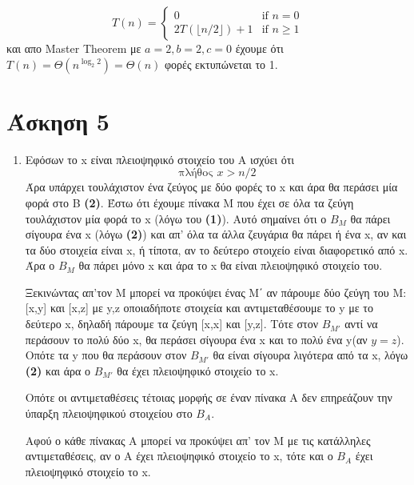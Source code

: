 \documentclass[a4paper,10pt]{article}
\begin{document}
\begin{flushleft}
\begin{enumerate}
        \begin{equation*}
            T(n) = 
            \begin{cases}
            0 & \text{if } n = 0 \\
            2T(\lfloor n/2 \rfloor) + 1 & \text{if } n \geq 1
            \end{cases}
        \end{equation*}
        και απο Master Theorem με $a=2, b=2, c=0$ έχουμε ότι $T(n) = \Theta(n^{\log_2{2}}) = \Theta(n)$ φορές εκτυπώνεται το 1.
    \end{enumerate}

    \newpage
    \section*{Άσκηση 5}
    \begin{enumerate}
        \item Εφόσων το x είναι πλειοψηφικό στοιχείο του Α ισχύει ότι
        \begin{equation}
            \text{πλήθος } x > n/2
        \end{equation}
        Άρα υπάρχει τουλάχιστον ένα ζεύγος με δύο φορές το x και άρα θα περάσει μία φορά στο Β \textbf{(2)}.
        Έστω ότι έχουμε πίνακα Μ που έχει σε όλα τα ζεύγη τουλάχιστον μία φορά το x (λόγω του \textbf{(1)}). Αυτό σημαίνει ότι ο $B_M$ θα πάρει σίγουρα ένα x (λόγω \textbf{(2)}) και απ' όλα τα άλλα ζευγάρια θα πάρει ή ένα x, αν και τα δύο στοιχεία είναι x, ή τίποτα, αν το δεύτερο στοιχείο είναι διαφορετικό από x. Άρα ο $B_M$ θα πάρει μόνο x και άρα το x θα είναι πλειοψηφικό στοιχείο του.

        Ξεκινώντας απ'τον Μ μπορεί να προκύψει ένας Μ΄ αν πάρουμε δύο ζεύγη του Μ: [x,y] και [x,z] με y,z οποιαδήποτε στοιχεία και αντιμεταθέσουμε το y με το δεύτερο x, δηλαδή πάρουμε τα ζεύγη [x,x] και [y,z]. Τότε στον $B_{M'}$ αντί να περάσουν το πολύ δύο x, θα περάσει σίγουρα ένα x και το πολύ ένα y(αν $y=z$). Οπότε τα y που θα περάσουν στον $B_{M'}$ θα είναι σίγουρα λιγότερα από τα x, λόγω \textbf{(2)} και άρα ο $B_{M'}$ θα έχει πλειοψηφικό στοιχείο το x.

        Οπότε οι αντιμεταθέσεις τέτοιας μορφής σε έναν πίνακα Α δεν επηρεάζουν την ύπαρξη πλειοψηφικού στοιχείου στο $B_A$.

        Αφού ο κάθε πίνακας Α μπορεί να προκύψει απ' τον Μ με τις κατάλληλες αντιμεταθέσεις, αν ο Α έχει πλειοψηφικό στοιχείο το x, τότε και ο $B_A$ έχει πλειοψηφικό στοιχείο το x.


\end{enumerate}
\end{flushleft}
\end{document}
